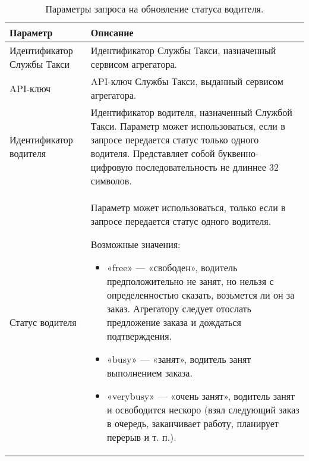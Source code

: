             \begin{table}[h]
	            \begin{center}
	            \label{change_driver_status_request_parametrs}
	            \caption {Параметры запроса на обновление статуса водителя.}
	            \setlength{\extrarowheight}{2mm}
	            \begin{tabular}{|p{5cm}|p{10cm}|}
	               \hline     \textbf{Параметр}&\textbf{Описание} \\ [2mm]

	               
	               \hline   Идентификатор Службы Такси  & Идентификатор Службы Такси, назначенный сервисом агрегатора.\\ [2mm]

	               \hline   API-ключ  & API-ключ Службы Такси, выданный сервисом агрегатора.\\ [2mm]

	               \hline   Идентификатор водителя  & Идентификатор водителя, назначенный Службой Такси. Параметр может использоваться, если в запросе передается статус только одного водителя. Представляет собой буквенно-цифровую последовательность не длиннее 32 символов. \\ [2mm]
	               
	               \hline   Статус водителя  & 

		               Параметр может использоваться, только если в запросе передается статус одного водителя. 

		               Возможные значения: 
		               		\begin{itemize}
							
								\item {«free» — «свободен», водитель предположительно не занят, но нельзя с определенностью сказать, возьмется ли он за заказ. Агрегатору следует отослать предложение заказа и дождаться подтверждения.}
								
								\item{«busy» — «занят», водитель занят выполнением заказа.}

								\item{«verybusy» — «очень занят», водитель занят и освободится нескоро (взял следующий заказ в очередь, заканчивает работу, планирует перерыв и т. п.).}
							
							\end{itemize} \\ [2mm]

	               \hline
	            \end{tabular}
	            \end{center}
            \end{table}

